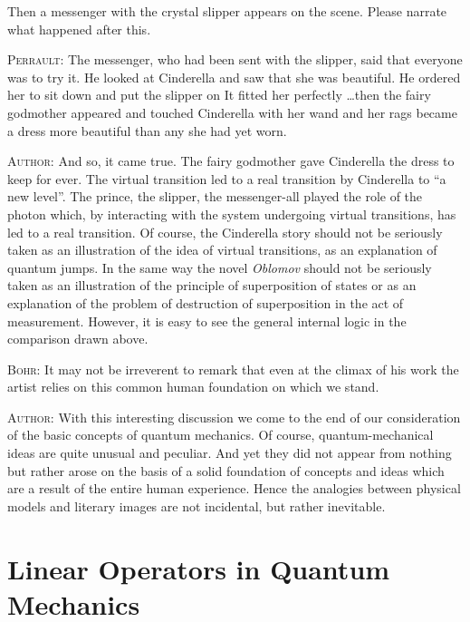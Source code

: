\documentclass[a4paper,sfsidenotes,colorlinks=true]{tufte-book}
\numberwithin{equation}{section}
\numberwithin{figure}{section}
\begin{document}
Then a messenger with the crystal slipper appears on the scene. Please
narrate what happened after this.


\textsc{Perrault:} The messenger, who had been sent with the slipper,
said that everyone was to try it. He looked at Cinderella and saw that
she was beautiful. He ordered her to sit down and put the slipper on
It fitted her perfectly \ldots then the fairy godmother appeared and
touched Cinderella with her wand and her rags became a dress more
beautiful than any she had yet worn.


\textsc{Author:} And so, it came true. The fairy godmother gave
Cinderella the dress to keep for ever. The virtual transition led to a
real transition by Cinderella to ``a new level''. The prince, the
slipper, the messenger-all played the role of the photon which, by
interacting with the system undergoing virtual transitions, has led to
a real transition. Of course, the Cinderella story should not be
seriously taken as an illustration of the idea of virtual transitions,
as an explanation of quantum jumps. In the same way the novel \emph{Oblomov}
should not be seriously taken as an illustration of the principle of
superposition of states or as an explanation of the problem of
destruction of superposition in the act of measurement. However, it is
easy to see the general internal logic in the comparison drawn above.


\textsc{Bohr:} It may not be irreverent to remark that even at the
climax of his work the artist relies on this common human foundation
on which we stand.


\textsc{Author:} With this interesting discussion we come to the end of our
consideration of the basic concepts of quantum mechanics. Of course,
quantum-mechanical ideas are quite unusual and peculiar. And yet they
did not appear from nothing but rather arose on the basis of a solid
foundation of concepts and ideas which are a result of the entire
human experience. Hence the analogies between physical models and
literary images are not incidental, but rather inevitable.
\cleardoublepage

\chapter{Linear Operators in Quantum Mechanics}
\end{document}
